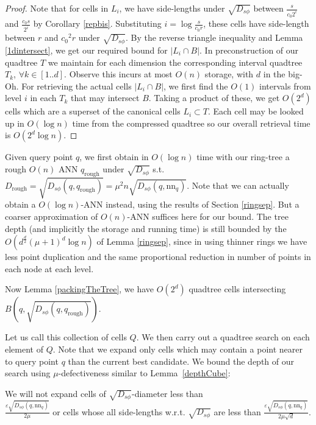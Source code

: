 \documentclass[11pt]{myclass}
\newcommand{\sbreg}{\ensuremath{D_{s\phi}}}
\newcommand{\eps}{\varepsilon}
\begin{document}
\begin{proof}
Note that for cells in $L_i$, we have side-lengths under $\sqrt{\sbreg}$ between $\frac{s}{c_0 2^i}$ and $\frac{c_0 s}{2^i}$ by Corollary \ref{repbis}.
 Substituting $i = \log \frac{s}{c_0 r}$,  these cells have side-length between $r$ and ${c_0}^2 r$ under $\sqrt{\sbreg}$. 
By the reverse triangle inequality and Lemma \ref{1dintersect}, we get our required bound for $|L_i \cap B|$.
In preconstruction of our quadtree $T$ we maintain for each dimension the corresponding interval quadtree $T_k$, $\forall k\in [1..d]$. 
Observe this incurs at most $O(n)$ storage, with $d$ in the big-Oh.  For retrieving the actual cells $|L_i \cap B|$, we first
find the $O(1)$ intervals from level $i$ in each $T_k$ that may intersect $B$. Taking a product of these, we get $O(2^d)$ cells 
which are a superset of the canonical cells $L_i \subset T$. Each cell may be looked up in $O(\log n)$ time from the compressed
 quadtree \cite{snotes} so our overall retrieval time is $O (2^d \log n)$.
\end{proof}


 Given query point $q$, we first obtain in $O(\log n)$ time with our ring-tree a rough $O(n)$ ANN $q_{\text{rough}}$ 
under $\sqrt{\sbreg}$ s.t. \\ $D_{\text{rough}} = \sqrt{\sbreg(q, q_{\text{rough}})} = \mu^2 n \sqrt{\sbreg (q, \text{nn}_q)}$.
Note that we can actually obtain a $O(\log n)$-ANN instead, using the results of Section \ref{ringsep}. But a coarser approximation
of $O(n)$-ANN suffices here for our bound. The tree depth (and implicitly the storage and running time) is still bounded
by the $O(d^{\frac{d}{2}} (\mu+1)^d \log n)$ of Lemma \ref{ringsep}, since in using thinner rings we have less point duplication
and the same proportional reduction in number of points in each node at each level.


Now Lemma \ref{packingTheTree}, we have $O(2^d)$ quadtree cells intersecting  $B (q, \sqrt{\sbreg (q, q_{\text{rough}})} )$.

 Let us call this collection of cells $Q$.  We then carry out a quadtree search on each element of $Q$. Note that
 we expand only cells which may contain a point nearer to query point $q$ than the current best candidate.  
We bound the depth of our search using $\mu$-defectiveness similar to Lemma~\ref{depthCube}:

\begin{lemma}\label{modDepth}
We will not expand cells of $\sqrt{\sbreg}$-diameter less than \\$\frac{\eps  \sqrt{\sbreg(q, \text{nn}_q)}}{2 \mu}$ or cells whose all side-lengths w.r.t. $\sqrt{\sbreg}$ are less than $\frac{\eps  \sqrt{\sbreg(q, \text{nn}_q)}}{2 \mu \sqrt{d}}$.
\end{lemma}
\end{document}
